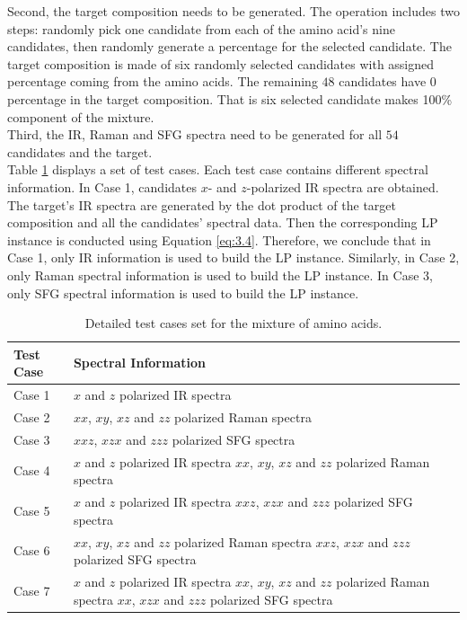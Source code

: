 Second, the target composition needs to be generated. The operation includes two steps: randomly pick one candidate from each of the amino acid's nine candidates, then randomly generate a percentage for the selected candidate. The target composition is made of six randomly selected candidates with assigned percentage coming from the amino acids. The remaining $48$ candidates have $0$ percentage in the target composition. That is six selected candidate makes 100\% component of the mixture. \\

Third, the IR, Raman and SFG spectra need to be generated for all $54$ candidates and the target. \\

Table \ref{tab:5.1} displays a set of test cases. Each test case contains different spectral information. In Case 1, candidates $x$- and $z$-polarized IR spectra are obtained. The target's IR spectra are generated by the dot product of the target composition and all the candidates' spectral data. Then the corresponding LP instance is conducted using Equation \ref{eq:3.4}. Therefore, we conclude that in Case 1, only IR information is used to build the LP instance. Similarly, in Case 2, only Raman spectral information is used to build the LP instance. In Case 3, only SFG spectral information is used to build the LP instance. \\

\begin{table}[ht!]
\begin{center}
{\def\arraystretch{1.5}
\begin{tabular}{| l | p{3in} | }
\hline
Test Case & Spectral Information \\
\hline
Case 1 & $x$ and $z$ polarized IR spectra\\
\hline
Case 2 & $xx$, $xy$, $xz$ and $zz$ polarized Raman spectra \\
\hline
Case 3 & $xxz$, $xzx$ and $zzz$ polarized SFG spectra \\
\hline
Case 4 & $x$ and $z$ polarized IR spectra \newline $xx$, $xy$, $xz$ and $zz$ polarized Raman spectra \\
\hline
Case 5 & $x$ and $z$ polarized IR spectra \newline $xxz$, $xzx$ and $zzz$ polarized SFG spectra　\\
\hline
Case 6 & $xx$, $xy$, $xz$ and $zz$ polarized Raman spectra \newline $xxz$, $xzx$ and $zzz$ polarized SFG spectra \\
\hline
Case 7 & $x$ and $z$ polarized IR spectra \newline
 $xx$, $xy$, $xz$ and $zz$ polarized Raman spectra \newline 
 $xx$, $xzx$ and $zzz$ polarized SFG spectra \\
\hline
\end{tabular} 
}
\end{center}
\caption{Detailed test cases set for the mixture of amino acids.} 
\label{tab:5.1} 
\end{table}	

